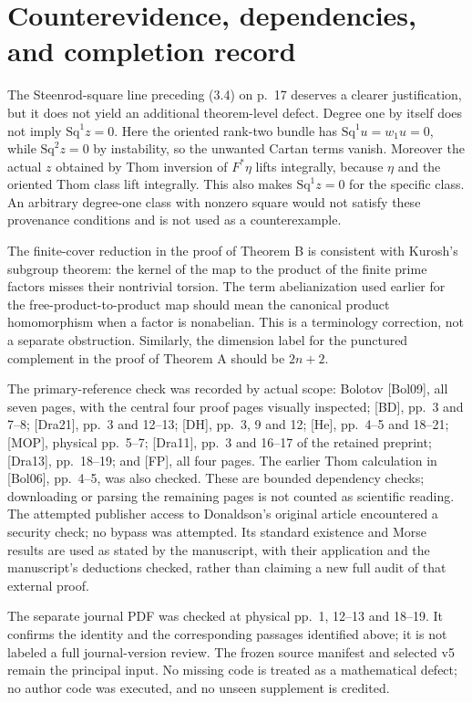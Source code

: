 \documentclass[10pt]{article}
\begin{document}
\section*{Counterevidence, dependencies, and completion record}
The Steenrod-square line preceding (3.4) on p. 17 deserves a clearer justification, but it does not yield an additional theorem-level defect. Degree one by itself does not imply \(\mathrm{Sq}^1z=0\). Here the oriented rank-two bundle has \(\mathrm{Sq}^1u=w_1u=0\), while \(\mathrm{Sq}^2z=0\) by instability, so the unwanted Cartan terms vanish. Moreover the actual \(z\) obtained by Thom inversion of \(F^*\eta\) lifts integrally, because \(\eta\) and the oriented Thom class lift integrally. This also makes \(\mathrm{Sq}^1z=0\) for the specific class. An arbitrary degree-one class with nonzero square would not satisfy these provenance conditions and is not used as a counterexample.\par
The finite-cover reduction in the proof of Theorem B is consistent with Kurosh’s subgroup theorem: the kernel of the map to the product of the finite prime factors misses their nontrivial torsion. The term abelianization used earlier for the free-product-to-product map should mean the canonical product homomorphism when a factor is nonabelian. This is a terminology correction, not a separate obstruction. Similarly, the dimension label for the punctured complement in the proof of Theorem A should be \(2n+2\).\par
The primary-reference check was recorded by actual scope: Bolotov [Bol09], all seven pages, with the central four proof pages visually inspected; [BD], pp. 3 and 7–8; [Dra21], pp. 3 and 12–13; [DH], pp. 3, 9 and 12; [He], pp. 4–5 and 18–21; [MOP], physical pp. 5–7; [Dra11], pp. 3 and 16–17 of the retained preprint; [Dra13], pp. 18–19; and [FP], all four pages. The earlier Thom calculation in [Bol06], pp. 4–5, was also checked. These are bounded dependency checks; downloading or parsing the remaining pages is not counted as scientific reading. The attempted publisher access to Donaldson’s original article encountered a security check; no bypass was attempted. Its standard existence and Morse results are used as stated by the manuscript, with their application and the manuscript’s deductions checked, rather than claiming a new full audit of that external proof.\par
The separate journal PDF was checked at physical pp. 1, 12–13 and 18–19. It confirms the identity and the corresponding passages identified above; it is not labeled a full journal-version review. The frozen source manifest and selected v5 remain the principal input. No missing code is treated as a mathematical defect; no author code was executed, and no unseen supplement is credited.\par
\end{document}
